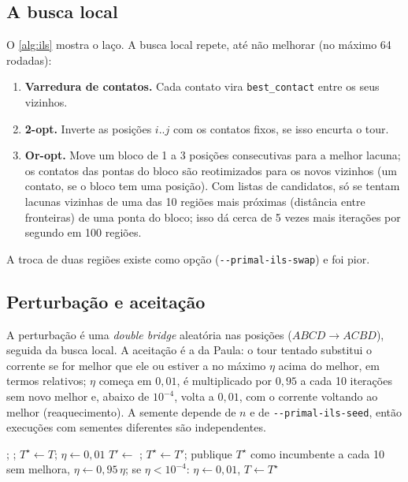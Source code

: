 \documentclass[11pt,a4paper]{article}
\theoremstyle{plain}\newtheorem{proposicao}{Proposição}
\theoremstyle{definition}\newtheorem{definicao}{Definição}
\theoremstyle{plain}\newtheorem{teorema}{Teorema}
\theoremstyle{plain}\newtheorem{lema}{Lema}
\newcommand{\abs}[1]{\lvert#1\rvert}
\newcommand{\code}[1]{\texttt{\small #1}}
\begin{document}
\subsection{A busca local}
O \cref{alg:ils} mostra o laço. A busca local repete, até não melhorar (no máximo 64 rodadas):
\begin{enumerate}[leftmargin=*,itemsep=2pt]
\item \textbf{Varredura de contatos.} Cada contato vira \code{best\_contact} entre os seus vizinhos.
\item \textbf{2-opt.} Inverte as posições \(i..j\) com os contatos fixos, se isso encurta o tour.
\item \textbf{Or-opt.} Move um bloco de 1 a 3 posições consecutivas para a melhor lacuna; os contatos das pontas do bloco são reotimizados para os novos vizinhos (um contato, se o bloco tem uma posição). Com listas de candidatos, só se tentam lacunas vizinhas de uma das 10 regiões mais próximas (distância entre fronteiras) de uma ponta do bloco; isso dá cerca de 5 vezes mais iterações por segundo em 100 regiões.
\end{enumerate}
A troca de duas regiões existe como opção (\code{-{}-primal-ils-swap}) e foi pior.

\subsection{Perturbação e aceitação}
A perturbação é uma \emph{double bridge} aleatória nas posições (\(ABCD\to ACBD\)), seguida da busca local. A aceitação é a da Paula: o tour tentado substitui o corrente se for melhor que ele ou estiver a no máximo \(\eta\) acima do melhor, em termos relativos; \(\eta\) começa em \(0{,}01\), é multiplicado por \(0{,}95\) a cada 10 iterações sem novo melhor e, abaixo de \(10^{-4}\), volta a \(0{,}01\), com o corrente voltando ao melhor (reaquecimento). A semente depende de \(n\) e de \code{-{}-primal-ils-seed}, então execuções com sementes diferentes são independentes.

\begin{algorithm}[ht]\small
\caption{A ILS (esquema; padrões entre parênteses).}\label{alg:ils}
\begin{algorithmic}[1]
  \State {}; ; $T^\star\gets T$; $\eta\gets0{,}01$
    \State $T'\gets$ ; 
    \IfThen{$\abs{T'}<(1+0{,}01)\abs{T^\star}$}{\Call{Janelas}{$T'$}}
    \IfThen{$\abs{T'}<\abs T$ ou $\abs{T'}\le(1+\eta)\abs{T^\star}$}{$T\gets T'$}
    \If{$\abs{T'}<\abs{T^\star}$} $T^\star\gets T'$; publique $T^\star$ como incumbente
    \Else{} a cada 10 sem melhora, $\eta\gets0{,}95\,\eta$; se $\eta<10^{-4}$: $\eta\gets0{,}01$, $T\gets T^\star$
    \EndIf
  \EndWhile
\EndFunction
\end{algorithmic}
\end{algorithm}
\end{document}
